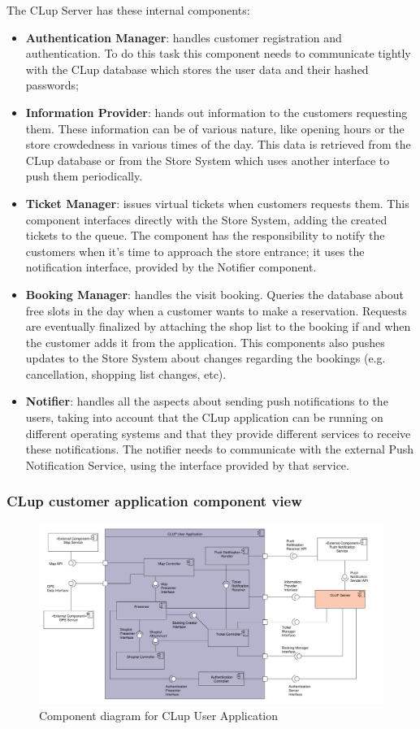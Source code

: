 The CLup Server has these internal components:
\begin{itemize}
    \item \textbf{Authentication Manager}: handles customer registration and authentication. To do this task this component needs to communicate tightly with the CLup database which stores the user data and their hashed passwords;
    \item \textbf{Information Provider}: hands out information to the customers requesting them. These information can be of various nature, like opening hours or the store crowdedness in various times of the day. This data is retrieved from the CLup database or from the Store System which uses another interface to push them periodically.
    \item \textbf{Ticket Manager}: issues virtual tickets when customers requests them. This component interfaces directly with the Store System, adding the created tickets to the queue. The component has the responsibility to notify the customers when it's time to approach the store entrance; it uses the notification interface, provided by the Notifier component.
    \item \textbf{Booking Manager}: handles the visit booking. Queries the database about free slots in the day when a customer wants to make a reservation. Requests are eventually finalized by attaching the shop list to the booking if and when the customer adds it from the application. This components also pushes updates to the Store System about changes regarding the bookings (e.g. cancellation, shopping list changes, etc).
    \item \textbf{Notifier}: handles all the aspects about sending push notifications to the users, taking into account that the CLup application can be running on different operating systems and that they provide different services to receive these notifications. The notifier needs to communicate with the external Push Notification Service, using the interface provided by that service.
\end{itemize}

\subsubsection{CLup customer application component view}
\begin{figure}[H]
    \includegraphics[width=\textwidth]{Images/UML_user_app_component.pdf}
    \caption{\label{fig:UML_comp_CLup_user_app}Component diagram for CLup User Application}
\end{figure}

